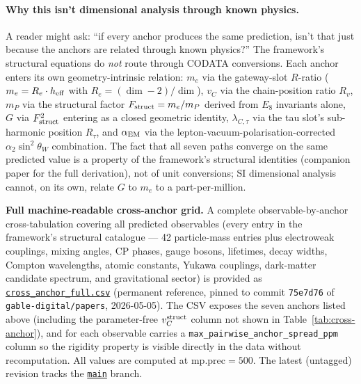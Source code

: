 \documentclass[reprint,amsmath,amssymb,aps,prd,longbibliography,floatfix]{revtex4-2}
\begin{document}
\paragraph{Why this isn't dimensional analysis through known physics.}
A reader might ask: ``if every anchor produces the same prediction,
isn't that just because the anchors are related through known
physics?'' The framework's structural equations do \emph{not} route
through CODATA conversions. Each anchor enters its own
geometry-intrinsic relation: $m_e$ via the gateway-slot $R$-ratio
($m_e = R_e \cdot h_{\rm eff}$ with $R_e = (\dim - 2)/\dim$), $v_C$
via the chain-position ratio $R_v$, $m_P$ via the structural
factor $F_{\rm struct} = m_e/m_P$ derived from $E_8$ invariants
alone, $G$ via $F_{\rm struct}^2$ entering as a closed
geometric identity, $\lambda_{C,\tau}$ via the tau slot's
sub-harmonic position $R_\tau$, and $\alpha_{\rm EM}$ via the
lepton-vacuum-polarisation-corrected $\alpha_2 \sin^2\theta_W$
combination. The fact that all seven paths converge on the same
predicted value is a property of the framework's structural
identities (companion paper for the full derivation), not of
unit conversions; SI dimensional analysis cannot, on its own,
relate $G$ to $m_e$ to a part-per-million.

\begin{widetext}

\end{widetext}

\noindent\textbf{Full machine-readable cross-anchor grid.}
A complete observable-by-anchor cross-tabulation covering all
\crossanchorNObservables{} predicted observables (every entry in the
framework's structural catalogue --- 42 particle-mass entries plus
electroweak couplings, mixing angles, CP phases, gauge bosons,
lifetimes, decay widths, Compton wavelengths, atomic constants,
Yukawa couplings, dark-matter candidate spectrum, and gravitational
sector) is provided as
\href{https://github.com/gable-digital/papers/blob/75e7d76/substrate_falsifiable_predictions/cross_anchor_full.csv}{\texttt{cross\_anchor\_full.csv}}
(permanent reference, pinned to commit
\texttt{75e7d76} of \texttt{gable-digital/papers}, 2026-05-05).
The CSV exposes the seven anchors listed above (including the
parameter-free $v_C^{\rm struct}$ column not shown in
Table~\ref{tab:cross-anchor}), and for each observable carries a
\texttt{max\_pairwise\_anchor\_spread\_ppm} column so the rigidity
property is visible directly in the data without recomputation. All
values are computed at $\mathrm{mp.prec}=500$. The latest (untagged)
revision tracks the
\href{https://github.com/gable-digital/papers/tree/main/substrate_falsifiable_predictions}{\texttt{main}}
branch.
\end{document}
